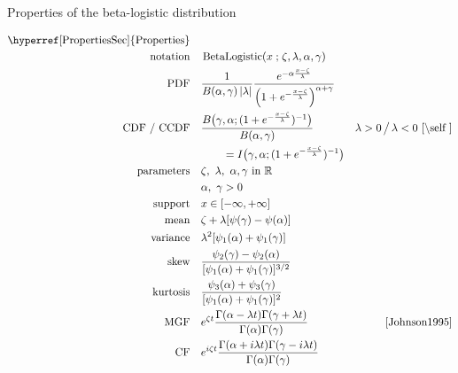 

\begin{table*}[p]
\caption[Beta-logistic distribution -- Properties]{Properties of the beta-logistic distribution}
\begin{align*}
\text{\hyperref[PropertiesSec]{Properties}}  \quad& \\
\text{notation} \quad &  \op{BetaLogistic}(x\given \pLoc,\pScale,\alpha,\gamma)  
\checked
\\
\text{PDF}\quad &  
\frac{1}{B(\alpha, \gamma) \left| \pScale\right|}
 \frac{e^{-\alpha \frac{x-\pLoc}{\pScale} }} { \left(1 + e^{-\frac{x-\pLoc}{\pScale}  }\right)^{\alpha+\gamma} }
\checked 
\\
\text{CDF / CCDF} \quad  &  
 \frac{B\big(\gamma, \alpha ;  ( 1+e^{-\frac{x-\pLoc}{\pScale}} )^{-1}  \big) }{B(\alpha,\gamma)}
& \pScale>0 \, \big/ \, \pScale<0 \checked
 \text{ \cite{\self}} \\
& \qquad  = I\big(  \gamma, \alpha;  ( 1+e^{-\frac{x-\pLoc}{\pScale}} )^{-1}  \big) \checked
\\
\text{parameters}\quad &   \pLoc,\ \pScale,\ \alpha, \gamma  \text{ in } \mathbb{R} \checked \\
& \alpha,\ \gamma >0 \checked
\\
\text{support} \quad &   x \in [-\infty,+\infty] \checked
\\
\text{mean} \quad  &  \pLoc +\pScale [ \psi(\gamma)-\psi(\alpha) ]  \checked %
\\
\text{variance} \quad  & \pScale^2 [\psi_1(\alpha) + \psi_1(\gamma) ] \checked %
\\
\text{skew} \quad  &  \frac{ \psi_2(\gamma) - \psi_2(\alpha)}{[\psi_1(\alpha) + \psi_1(\gamma)]^{3/2}} \checked
\\
\text{kurtosis} \quad  &   \frac{\psi_3(\alpha) + \psi_3(\gamma)}{[\psi_1(\alpha) + \psi_1(\gamma)]^{2}} \checked
\\
\text{MGF} \quad  &  e^{ \pLoc t}\frac{\Gamma(\alpha-\pScale  t) \Gamma(\gamma+\pScale t)}{\Gamma(\alpha)\Gamma(\gamma)}
& \text{\cite{Johnson1995}} \checked
\\
\text{CF} \quad  &    e^{i \pLoc t} \frac{\Gamma(\alpha+ i \pScale  t) \Gamma(\gamma-i \pScale t)}{\Gamma(\alpha)\Gamma(\gamma)} \checked
\end{align*}
\end{table*}

